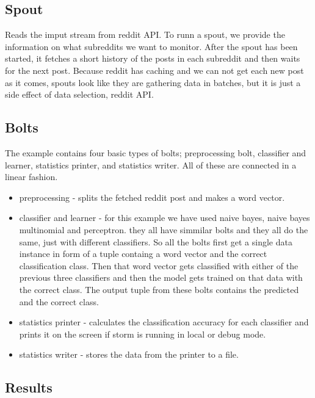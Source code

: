 \documentclass[journal]{IEEEtran/IEEEtran}
\begin{document}
\subsection{Spout}

Reads the imput stream from reddit API. To runn a spout, we provide the information on what subreddits we want to monitor. After the spout has been started, it fetches a short history of the posts in each subreddit and then waits for the next post. Because reddit has caching and we can not get each new post as it comes, spouts look like they are gathering data in batches, but it is just a side effect of data selection, reddit API.

\subsection{Bolts}

The example contains four basic types of bolts; preprocessing bolt, classifier and learner, statistics printer, and statistics writer. All of these are connected in a linear fashion. \\

\begin{itemize}
    \item preprocessing - splits the fetched reddit post and makes a word vector.\\
    \item classifier and learner - for this example we have used naive bayes, naive bayes multinomial and perceptron. they all have simmilar bolts and they all do the same, just with different classifiers. So all the bolts first get a single data instance in form of a tuple containg a word vector and the correct classification class. Then that word vector gets classified with either of the previous three classifiers and then the model gets trained on that data with the correct class. The output tuple from these bolts contains the predicted and the correct class. \\
    \item statistics printer - calculates the classification accuracy for each classifier and prints it on the screen if storm is running in local or debug mode.\\
    \item statistics writer - stores the data from the printer to a file. \\
\end{itemize}


\subsection{Results}
\end{document}
